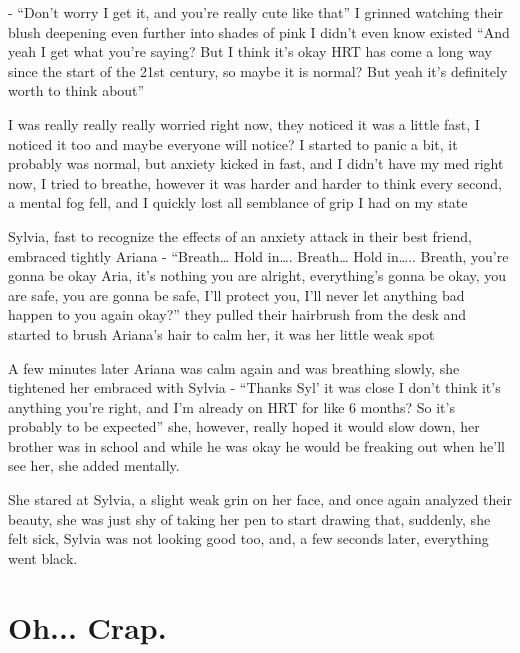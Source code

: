 \documentclass[hidelinks,12pt,a4paper]{book}
\begin{document}
- “Don't worry I get it, and you're really cute like that” 
I grinned watching their blush deepening even further into shades of pink I didn't even know existed
“And yeah I get what you're saying? But I think it's okay HRT has come a 
long way since the start of the 21st century, so maybe it is normal? But yeah it's definitely worth to think about”\par
\bigskip

I was really really really worried right now, 
they noticed it was a little fast, I noticed it too and maybe everyone will notice? 
I started to panic a bit, it probably was normal, but anxiety kicked in fast, and I didn't have my med right now,
 I tried to breathe, however it was harder and harder to think every second, a mental fog fell, and I quickly lost all
semblance of grip I had on my state\par
\bigskip

Sylvia, fast to recognize the effects of an anxiety attack in their best friend, embraced tightly Ariana\newline
- “Breath… Hold in…. Breath… Hold in….. Breath, you're gonna be okay Aria, 
it's nothing you are alright, everything's gonna be okay, you are safe, you are gonna be safe, I'll protect you, 
I'll never let anything bad happen to you again okay?” they pulled their hairbrush from the desk and started to 
brush Ariana's hair to calm her, it was her little weak spot\par
\bigskip

A few minutes later Ariana was calm again and was breathing slowly, she tightened her embraced with Sylvia\newline
- “Thanks Syl' it was close I don't think it's anything you're right, and I'm already on HRT for like 
6 months? So it's probably to be expected” she, however, really hoped it would slow down, her brother 
was in school and while he was okay he would be freaking out when he'll see her, she added mentally.\par
\bigskip

She stared at Sylvia, a slight weak grin on her face, and once again analyzed their beauty,
 she was just shy of taking her pen to start drawing that, suddenly, she felt sick,
Sylvia was not looking good too, and, a few seconds later, everything went black.


\chapter{Oh... Crap.}
\end{document}
